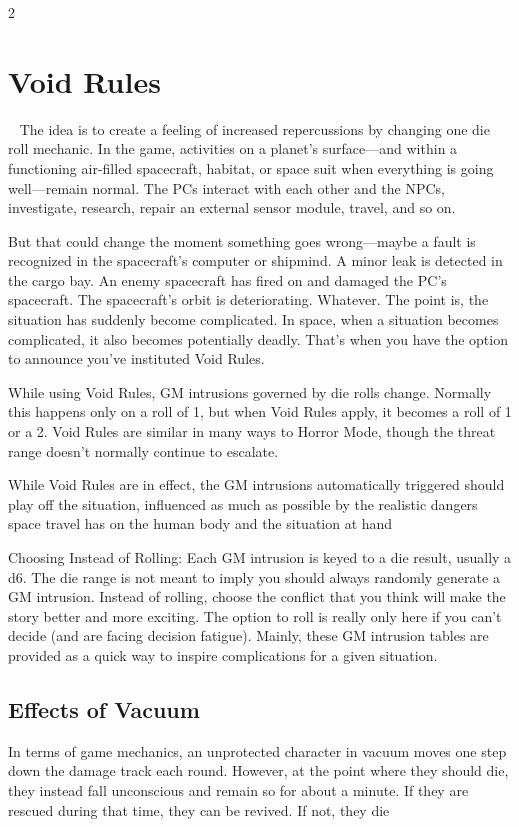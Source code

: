 \begin{multicols}{2}

\chapter{Void Rules}
 
The idea is to create a feeling of increased repercussions by changing one die roll mechanic. In the game, activities on a planet’s surface—and within a functioning air-filled spacecraft, habitat, or space suit when everything is going well—remain normal. The PCs interact with each other and the NPCs, investigate, research, repair an external sensor module, travel, and so on. 

But that could change the moment something goes wrong—maybe a fault is recognized in the spacecraft’s computer or shipmind. A minor leak is detected in the cargo bay. An enemy spacecraft has fired on and damaged the PC’s spacecraft. The spacecraft’s orbit is deteriorating. Whatever. The point is, the situation has suddenly become complicated. In space, when a situation becomes complicated, it also becomes potentially deadly. That’s when you have the option to announce you’ve instituted Void Rules. 

While using Void Rules, GM intrusions governed by die rolls change. Normally this happens only on a roll of 1, but when Void Rules apply, it becomes a roll of 1 or a 2. Void Rules are similar in many ways to Horror Mode, though the threat range doesn’t normally continue to escalate. 

While Void Rules are in effect, the GM intrusions automatically triggered should play off the situation, influenced as much as possible by the realistic dangers space travel has on the human body and the situation at hand

Choosing Instead of Rolling: Each GM intrusion is keyed to a die result, usually a d6. The die range is not meant to imply you should always randomly generate a GM intrusion. Instead of rolling, choose the conflict that you think will make the story better and more exciting. The option to roll is really only here if you can’t decide (and are facing decision fatigue). Mainly, these GM intrusion tables are provided as a quick way to inspire complications for a given situation. 

\section{Effects of Vacuum}

In terms of game mechanics, an unprotected character in vacuum moves one step down the damage track each round. However, at the point where they should die, they instead fall unconscious and remain so for about a minute. If they are rescued during that time, they can be revived. If not, they die

\end{multicols}

